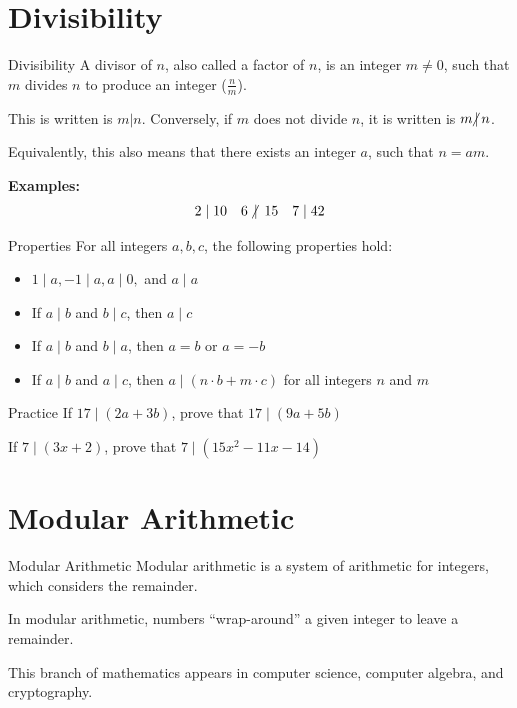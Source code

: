 \documentclass{beamer}
\newcommand{\ndiv}{\hspace{-4pt}\not|\hspace{2pt}}
\newcommand{\tdiv}{\; | \;}
\begin{document}
\section{Divisibility}
\begin{frame}{Divisibility}
    A divisor of $n$, also called a factor of $n$, is an integer $m \neq 0$, such that $m$ divides $n$ to produce an integer ($\frac{n}{m}$). \newline
    
    This is written is $m | n$. Conversely, if $m$ does not divide $n$, it is written is $m \ndiv n$. \newline
    
    Equivalently, this also means that there exists an integer $a$, such that $n = am$. \newline
    
    \textbf{Examples:}
    \begin{align*}
        2\tdiv 10 && 6\; \ndiv \; 15 && 7 \tdiv 42
    \end{align*}
\end{frame}

\begin{frame}{Properties}
    For all integers $a, b, c$, the following properties hold: 
    \begin{itemize}
        \item $1 \tdiv a, -1 \tdiv a, a \tdiv 0,$ and $a \tdiv a$
        \item If $a \tdiv b$ and $b \tdiv c$, then $a \tdiv c$
        \item If $a \tdiv b$ and $b  \tdiv a$, then $a = b$ or $a = -b$
        \item If $a \tdiv b$ and $a \tdiv c$, then $a  \tdiv (n \cdot b + m \cdot c)$ for all integers $n$ and $m$
    \end{itemize}
\end{frame}

\begin{frame}{Practice}
    \vspace{-5em}
    If $17 \tdiv (2a + 3b)$, prove that $17 \tdiv (9a + 5b)$
    
    \vspace{6em}
    
    If $7 \tdiv (3x + 2)$, prove that $7 \tdiv (15x^2 -11x - 14)$
\end{frame}

\section{Modular Arithmetic}
\begin{frame}{Modular Arithmetic}
    Modular arithmetic is a system of arithmetic for integers, which considers the remainder. \newline
    
    In modular arithmetic, numbers ``wrap-around'' a given integer to leave a remainder. \newline
    
    This branch of mathematics appears in computer science, computer algebra, and cryptography.
\end{frame}
\end{document}
